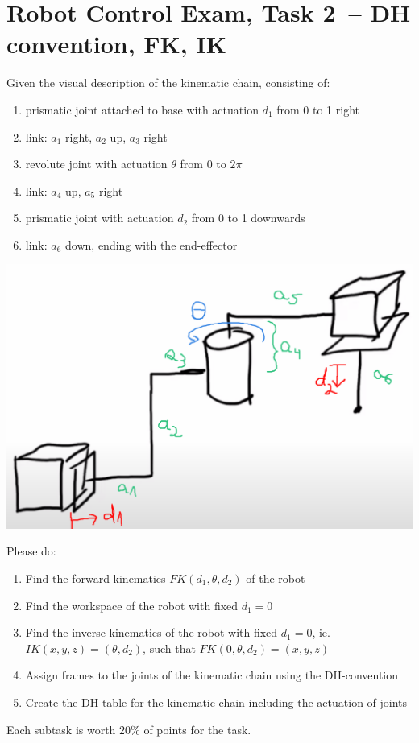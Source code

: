 \documentclass[12pt]{article}
\begin{document}
\section{Robot Control Exam, Task 2 – DH convention, FK, IK}

Given the visual description of the kinematic chain, consisting of:
\begin{enumerate}
    \item prismatic joint attached to base with actuation $d_1$ from 0 to 1 right 
    \item link: $a_1$ right, $a_2$ up, $a_3$ right
    \item revolute joint with actuation $\theta$ from 0 to $2\pi$
    \item link: $a_4$ up, $a_5$ right
    \item prismatic joint with actuation $d_2$ from 0 to 1 downwards
    \item link: $a_6$ down, ending with the end-effector
\end{enumerate}
\begin{center}
\includegraphics[scale=0.3]{theory-2.png}
\end{center}
Please do:
\begin{enumerate}
    \item Find the forward kinematics $FK(d_1, \theta, d_2)$ of the robot 
    \item Find the workspace of the robot with fixed $d_1 = 0$
    \item Find the inverse kinematics of the robot with fixed $d_1 = 0$, ie. $IK(x, y, z) = (\theta, d_2)$, such that $FK(0, \theta, d_2) = (x, y, z)$
    \item Assign frames to the joints of the kinematic chain using the DH-convention
    \item Create the DH-table for the kinematic chain including the actuation of joints
\end{enumerate}
Each subtask is worth $20\%$ of points for the task.  
\end{document}
